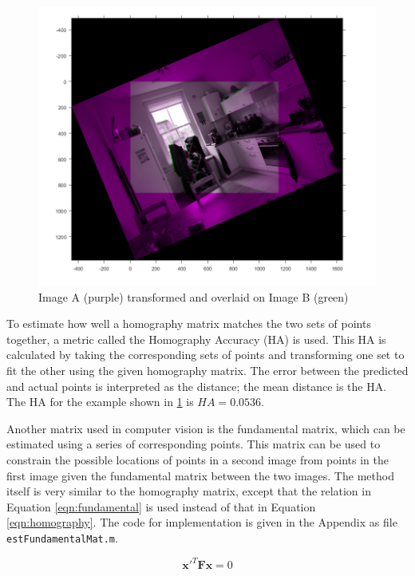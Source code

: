 \documentclass[a4paper, 10pt, conference]{ieeeconf}
\begin{document}
\begin{figure}[!ht]
  \centering
  \includegraphics[width=\linewidth]{pic/homographyExample}
  \caption{Image A (purple) transformed and overlaid on Image B (green)}
  \label{fig:homography}
\end{figure}

To estimate how well a homography matrix matches the two sets of points together, a metric called the Homography Accuracy (HA) is used. This HA is calculated by taking the corresponding sets of points and transforming one set to fit the other using the given homography matrix. The error between the predicted and actual points is interpreted as the distance; the mean distance is the HA. The HA for the example shown in \ref{fig:homography} is $HA=0.0536$.

Another matrix used in computer vision is the fundamental matrix, which can be estimated using a series of corresponding points. This matrix can be used to constrain the possible locations of points in a second image from points in the first image given the fundamental matrix between the two images. The method itself is very similar to the homography matrix, except that the relation in Equation \ref{eqn:fundamental} is used instead of that in Equation \ref{eqn:homography}. The code for implementation is given in the Appendix as file \texttt{estFundamentalMat.m}.

\begin{equation} \label{eqn:fundamental}
\textbf{x}'^T\textbf{Fx} = 0
\end{equation}
\end{document}
